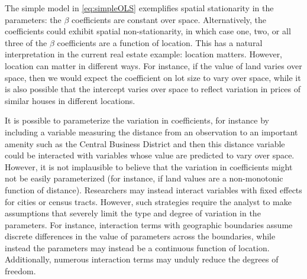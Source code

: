 \documentclass{article}\usepackage[]{graphicx}\usepackage[]{color}
\begin{document}
The simple model in \eqref{eq:simpleOLS} exemplifies spatial stationarity in the parameters: the $\beta$ coefficients are constant over space. Alternatively, the coefficients could exhibit spatial non-stationarity, in which case one, two, or all three of the $\beta$ coefficients are a function of location. This has a natural interpretation in the current real estate example: location matters. However, location can matter in different ways. For instance, if the value of land varies over space, then we would expect the coefficient on lot size to vary over space, while it is also possible that the intercept varies over space to reflect variation in prices of similar houses in different locations. 

It is possible to parameterize the variation in coefficients, for instance by including a variable measuring the distance from an observation to an important amenity such as the Central Business District and then this distance variable could be interacted with variables whose value are predicted to vary over space. However, it is not implausible to believe that the variation in coefficients might not be easily parameterized (for instance, if land values are a non-monotonic function of distance). Researchers may instead interact variables with fixed effects for cities or census tracts. However, such strategies require the analyst to make assumptions that severely limit the type and degree of variation in the parameters. For instance, interaction terms with geographic boundaries assume discrete differences in the value of parameters across the boundaries, while instead the parameters may instead be a continuous function of location. Additionally, numerous interaction terms may unduly reduce the degrees of freedom.
\end{document}
